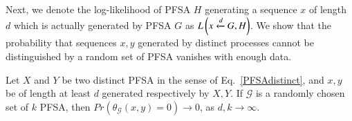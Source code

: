 \documentclass[9pt,journal,compsoc]{IEEEtran}
\begin{document}
{ Next, we denote the  log-likelihood of PFSA $H$ generating a sequence $x$ of length $d$  which is actually generated by PFSA $G$ as $L\left( x\xleftarrow{d} G, H \right)$. We show that the probability  that sequences $x,y$ generated by distinct processes    cannot be distinguished by a random set of PFSA vanishes with enough data.
   \begin{thm}\label{thmapproxmetric}
   	Let $X$ and $Y$ be two distinct PFSA in the sense of Eq.~\eqref{PFSAdistinct}, and $x,y$ be of length at least $d$ generated respectively by $X,Y$. If $\mathcal{G}$ is a randomly chosen set of $k$ PFSA, then
 $Pr(\theta_\mathcal{G}(x,y)=0) \rightarrow 0$, as $d,k \rightarrow \infty$.
   \end{thm}
   
   
 
}
\end{document}
